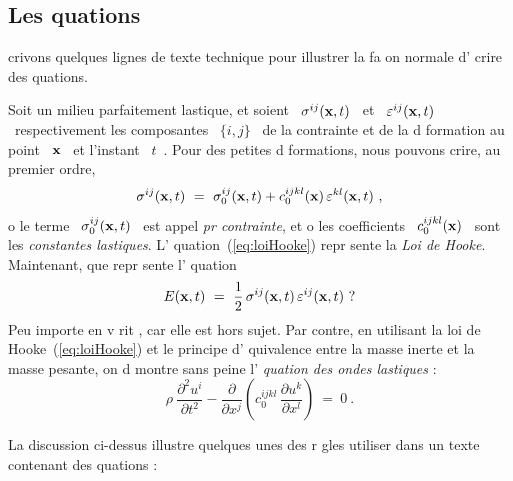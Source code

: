 \documentclass{article}
\begin{document}
\subsection{Les  quations}

 crivons quelques lignes de texte technique pour illustrer la fa on 
normale d' crire des  quations.

Soit un milieu parfaitement  lastique, et soient
\ $ \sigma^{ij} ({\bf x},t) $ \ 
et
\ $ \varepsilon^{ij} ({\bf x},t) $ \ 
respectivement les composantes 
\ $ \{i,j\} $ \ 
de la contrainte et de la d formation au point 
\ $ {\bf x} $ \ 
et   l'instant 
\ $ t $~.
Pour des petites d formations, nous pouvons  crire, au premier ordre,
\begin{equation}
     \sigma^{ij} ({\bf x},t) 
     \ = \  
     \sigma_0^{ij} ({\bf x},t) 
     + 
     c_0^{ijkl} ({\bf x}) 
     \,  
     \varepsilon^{kl} ({\bf x},t) 
     \ , 
          \label{eq:loiHooke}
\end{equation}
o  le terme 
\ $ \sigma_0^{ij} ({\bf x},t) $ \ 
est appel  \emph{pr contrainte\/}, et o  les coefficients 
\ $ c_0^{ijkl} ({\bf x}) $ \ 
sont les \emph{constantes  lastiques\/}. 
L' quation~(\ref{eq:loiHooke}) repr sente la \emph{ Loi de Hooke\/}.
Maintenant, que repr sente l' quation
\begin{equation}
     E({\bf x},t) 
     \ = \  
     \frac{1}{2} 
     \, 
     \sigma^{ij} ({\bf x},t) 
     \, 
     \varepsilon^{ij} ({\bf x},t)
     \ ? 
          \label{eq:energydensity}
\end{equation}
Peu importe en v rit , car elle est hors sujet. 
Par contre, en utilisant la loi de Hooke~(\ref{eq:loiHooke}) et le principe
 d' quivalence entre la masse inerte et la masse pesante, 
on d montre sans peine l'\emph{ quation des ondes  lastiques\/} :
\begin{equation}
     \rho \ 
     \frac{\partial^2 u^i}{\partial t^2} 
     - 
     \frac{\partial}{\partial x^j} 
     \left( 
           c_0^{ijkl} 
           \, 
           \frac{\partial u^k}{\partial x^l} 
     \right)
     \ = \  
     0 
     \ . 
          \label{eq:ondes}
\end{equation}

La discussion ci-dessus illustre quelques unes des r gles   utiliser dans 
un texte contenant des  quations :
\end{document}
